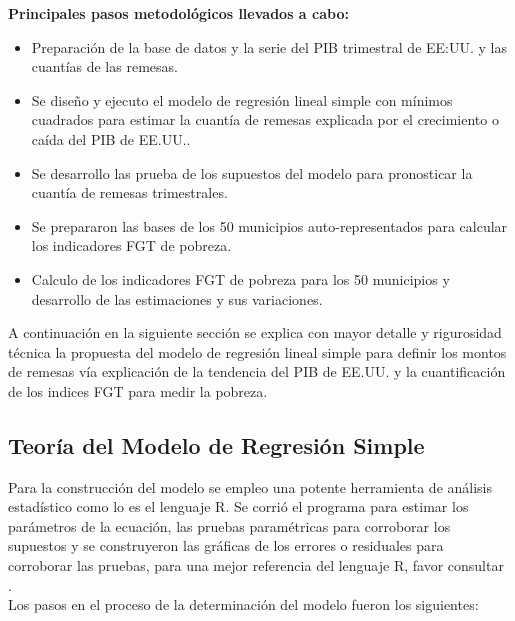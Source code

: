 \textbf{Principales pasos metodológicos llevados a cabo:}
\begin{itemize}
	\item Preparación de la base de datos y la serie del PIB trimestral de EE:UU. y las cuantías de las remesas.
	\item Se diseño y ejecuto el modelo de regresión lineal simple con mínimos cuadrados para estimar la cuantía de remesas explicada por el crecimiento o caída del PIB de EE.UU..
	\item Se desarrollo las prueba de los supuestos del modelo para pronosticar la cuantía de remesas trimestrales.
	\item Se prepararon las bases de los 50 municipios auto-representados para calcular los indicadores FGT de pobreza.
	\item Calculo de los indicadores FGT de pobreza para los 50 municipios y desarrollo de las estimaciones y sus variaciones.
	
\end{itemize}

A continuación en la siguiente sección se explica con mayor detalle y rigurosidad técnica la propuesta del modelo de regresión lineal simple para definir los montos de remesas vía explicación de la tendencia del PIB de EE.UU. y la cuantificación de los indices FGT para medir la pobreza.


\newpage

\subsection{Teoría del Modelo de Regresión Simple}


Para la construcción del modelo se empleo una potente herramienta de análisis estadístico como lo es el lenguaje R. Se corrió el programa para estimar los parámetros de la ecuación, las pruebas paramétricas para corroborar los supuestos  y se construyeron las gráficas de los errores o residuales para corroborar las pruebas, para una mejor referencia del lenguaje R, favor consultar \cite{wickham2016r} .\\

Los pasos en el proceso de la determinación del modelo fueron los siguientes:

